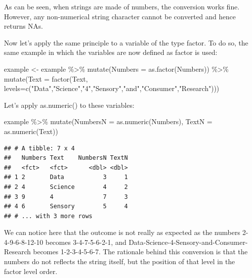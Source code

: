 \documentclass[
]{krantz}
\makeatletter
\newenvironment{Shaded}{\begin{snugshade}}{\end{snugshade}}
\newcommand{\AttributeTok}[1]{\textcolor[rgb]{0.61,0.61,0.61}{#1}}
\newcommand{\FunctionTok}[1]{\textcolor[rgb]{0,0,0}{#1}}
\newcommand{\NormalTok}[1]{#1}
\newcommand{\OtherTok}[1]{\textcolor[rgb]{0.37,0.37,0.37}{#1}}
\newcommand{\SpecialCharTok}[1]{\textcolor[rgb]{0,0,0}{#1}}
\newcommand{\StringTok}[1]{\textcolor[rgb]{0.5,0.5,0.5}{#1}}
\newenvironment{kframe}{%
\medskip{}
\setlength{\fboxsep}{.8em}
 \def\at@end@of@kframe{}%
 \ifinner\ifhmode%
  \def\at@end@of@kframe{\end{minipage}}%
  \begin{minipage}{\columnwidth}%
 \fi\fi%
 \def\FrameCommand##1{\hskip\@totalleftmargin \hskip-\fboxsep
 \colorbox{shadecolor}{##1}\hskip-\fboxsep
     \hskip-\linewidth \hskip-\@totalleftmargin \hskip\columnwidth}%
 \MakeFramed {\advance\hsize-\width
   \@totalleftmargin\z@ \linewidth\hsize
   \@setminipage}}%
 {\par\unskip\endMakeFramed%
 \at@end@of@kframe}
\renewenvironment{Shaded}{\begin{kframe}}{\end{kframe}}
\makeatother
\begin{document}
As can be seen, when strings are made of numbers, the conversion works fine. However, any non-numerical string character cannot be converted and hence returns NAs.

Now let's apply the same principle to a variable of the type factor. To do so, the same example in which the variables are now defined as factor is used:

\begin{Shaded}
\begin{Highlighting}[]
\NormalTok{example }\OtherTok{\textless{}{-}}\NormalTok{ example }\SpecialCharTok{\%\textgreater{}\%} 
  \FunctionTok{mutate}\NormalTok{(}\AttributeTok{Numbers =} \FunctionTok{as.factor}\NormalTok{(Numbers)) }\SpecialCharTok{\%\textgreater{}\%} 
  \FunctionTok{mutate}\NormalTok{(}\AttributeTok{Text =} \FunctionTok{factor}\NormalTok{(Text, }\AttributeTok{levels=}\FunctionTok{c}\NormalTok{(}\StringTok{"Data"}\NormalTok{,}\StringTok{"Science"}\NormalTok{,}\StringTok{"4"}\NormalTok{,}\StringTok{"Sensory"}\NormalTok{,}\StringTok{"and"}\NormalTok{,}\StringTok{"Consumer"}\NormalTok{,}\StringTok{"Research"}\NormalTok{)))}
\end{Highlighting}
\end{Shaded}

Let's apply as.numeric() to these variables:

\begin{Shaded}
\begin{Highlighting}[]
\NormalTok{example }\SpecialCharTok{\%\textgreater{}\%} 
  \FunctionTok{mutate}\NormalTok{(}\AttributeTok{NumbersN =} \FunctionTok{as.numeric}\NormalTok{(Numbers), }\AttributeTok{TextN =} \FunctionTok{as.numeric}\NormalTok{(Text))}
\end{Highlighting}
\end{Shaded}

\begin{verbatim}
## # A tibble: 7 x 4
##   Numbers Text    NumbersN TextN
##   <fct>   <fct>      <dbl> <dbl>
## 1 2       Data           3     1
## 2 4       Science        4     2
## 3 9       4              7     3
## 4 6       Sensory        5     4
## # ... with 3 more rows
\end{verbatim}

We can notice here that the outcome is not really as expected as the numbers 2-4-9-6-8-12-10 becomes 3-4-7-5-6-2-1, and Data-Science-4-Sensory-and-Consumer-Research becomes 1-2-3-4-5-6-7. The rationale behind this conversion is that the numbers do not reflects the string itself, but the position of that level in the factor level order.
\end{document}
